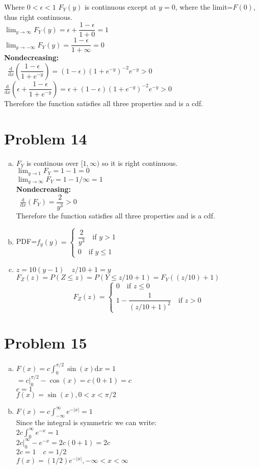 \documentclass{article}
\newcommand{\deriv}[1]{\frac{\mathrm{d}}{\mathrm{d}x} (#1)}
\newcommand{\dx}{\mathrm{d}x}
\begin{document}
\begin{flushleft}
\begin{enumerate}[(a)]
\[\]
Where $0<\epsilon<1$\medbreak
$F_Y(y)$ is continuous except at $y=0$, where the limit=$F(0)$, thus right continuous.\\
$\lim_{y\to \infty}F_Y(y)=\epsilon+\dfrac{1-\epsilon}{1+0}=1$\\
$\lim_{y\to -\infty}F_Y(y)=\dfrac{1-\epsilon}{1+\infty}=0$\\
\textbf{Nondecreasing:}\\\
$\deriv{\dfrac{1-\epsilon}{1+e^{-y}}}=(1-\epsilon)(1+e^{-y})^{-2}e^{-y}>0$\\
$\deriv{\epsilon+\dfrac{1-\epsilon}{1+e^{-y}}}=\epsilon+(1-\epsilon)(1+e^{-y})^{-2}e^{-y}>0$\\
Therefore the function satisfies all three properties and is a cdf.
\end{enumerate}
\section*{Problem 14}
\begin{enumerate}[(a)]
\item
$F_Y$ is continous over $[1,\infty)$ so it is right continuous.\\
$\lim_{y\to 1}F_Y=1-1=0$\\
$\lim_{y\to \infty}F_Y=1-1/\infty=1$\\
\textbf{Nondecreasing:}\\\
$\deriv{F_Y}=\dfrac{2}{y^3}>0$\\
Therefore the function satisfies all three properties and is a cdf.
\item
PDF=$f_y(y)=\begin{cases}
\dfrac{2}{y^3} \quad \text{if } y>1\\
0 \quad \text{if } y\leq 1
\end{cases}$
\item 
$z=10(y-1) \quad z/10+1=y$\\
$F_Z(z)=P(Z\leq z)=P(Y\leq z/10+1)=F_Y((z/10)+1)$
\[F_Z(z)=\begin{cases}
0 \quad \text{if } z \leq 0\\
1-\dfrac{1}{(z/10+1)^2} \quad \text{if } z>0
\end{cases}
\]
\end{enumerate}
\section*{Problem 15}
\begin{enumerate}[(a)]
\item
$F(x)=c\int_{0}^{\pi/2}\sin(x)\dx=1$\\
 $=c\big|_0^{\pi/2}-\cos(x)=c(0+1)=c$\\
 $c=1$\\
 $f(x)=\sin(x), 0<x<\pi/2$
\item
$F(x)=c\int_{-\infty}^{\infty}e^{-|x|}=1$\\
Since the integral is symmetric we can write:\\
$2c\int_{0}^{\infty}e^{-x}=1$\\
$2c\big|_0^{\infty}-e^{-x}=2c(0+1)=2c$\\
$2c=1 \quad c=1/2$\\
$f(x)=(1/2)e^{-|x|}, -\infty<x<\infty$
\end{enumerate}

\end{flushleft}
\end{document}
